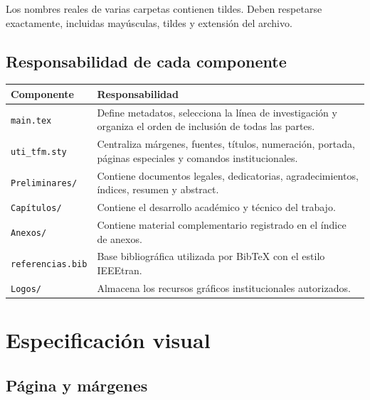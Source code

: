 \documentclass[12pt,a4paper,oneside]{report}
\begin{document}
Los nombres reales de varias carpetas contienen tildes. Deben respetarse exactamente, incluidas mayúsculas, tildes y extensión del archivo.

\section{Responsabilidad de cada componente}

\begin{longtable}{|p{3.6cm}|p{9cm}|}
  \hline
  \textbf{Componente} & \textbf{Responsabilidad} \\
  \hline
  \texttt{main.tex} & Define metadatos, selecciona la línea de investigación y organiza el orden de inclusión de todas las partes. \\
  \hline
  \texttt{uti\_tfm.sty} & Centraliza márgenes, fuentes, títulos, numeración, portada, páginas especiales y comandos institucionales. \\
  \hline
  \texttt{Preliminares/} & Contiene documentos legales, dedicatorias, agradecimientos, índices, resumen y abstract. \\
  \hline
  \texttt{Capítulos/} & Contiene el desarrollo académico y técnico del trabajo. \\
  \hline
  \texttt{Anexos/} & Contiene material complementario registrado en el índice de anexos. \\
  \hline
  \texttt{referencias.bib} & Base bibliográfica utilizada por BibTeX con el estilo IEEEtran. \\
  \hline
  \texttt{Logos/} & Almacena los recursos gráficos institucionales autorizados. \\
  \hline
\end{longtable}

\chapter{Especificación visual}

\section{Página y márgenes}
\end{document}
